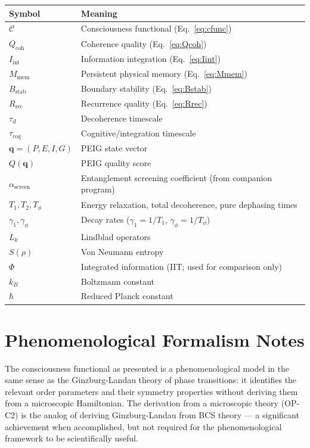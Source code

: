 \documentclass[12pt,letterpaper]{article}
\newcommand{\Cfunc}{\mathcal{C}}
\newcommand{\Qcoh}{Q_{\mathrm{coh}}}
\newcommand{\Iint}{I_{\mathrm{int}}}
\newcommand{\Mmem}{M_{\mathrm{mem}}}
\newcommand{\Bstab}{B_{\mathrm{stab}}}
\newcommand{\Rrec}{R_{\mathrm{rec}}}
\newcommand{\taud}{\tau_{\mathrm{d}}}
\newcommand{\taucog}{\tau_{\mathrm{cog}}}
\newcommand{\ascreen}{\alpha_{\mathrm{screen}}}
\begin{document}
\begin{center}
\begin{tabular}{p{2.5cm} p{9cm}}
\toprule
\textbf{Symbol} & \textbf{Meaning} \\
\midrule
$\Cfunc$ & Consciousness functional (Eq.~\ref{eq:cfunc}) \\
$\Qcoh$ & Coherence quality (Eq.~\ref{eq:Qcoh}) \\
$\Iint$ & Information integration (Eq.~\ref{eq:Iint}) \\
$\Mmem$ & Persistent physical memory (Eq.~\ref{eq:Mmem}) \\
$\Bstab$ & Boundary stability (Eq.~\ref{eq:Bstab}) \\
$\Rrec$ & Recurrence quality (Eq.~\ref{eq:Rrec}) \\
$\taud$ & Decoherence timescale \\
$\taucog$ & Cognitive/integration timescale \\
$\mathbf{q} = (P,E,I,G)$ & PEIG state vector \\
$Q(\mathbf{q})$ & PEIG quality score \\
$\ascreen$ & Entanglement screening coefficient (from companion program) \\
$T_1, T_2, T_\phi$ & Energy relaxation, total decoherence, pure dephasing times \\
$\gamma_1, \gamma_\phi$ & Decay rates ($\gamma_1 = 1/T_1$, $\gamma_\phi = 1/T_\phi$) \\
$L_k$ & Lindblad operators \\
$S(\rho)$ & Von Neumann entropy \\
$\Phi$ & Integrated information (IIT; used for comparison only) \\
$k_B$ & Boltzmann constant \\
$\hbar$ & Reduced Planck constant \\
\bottomrule
\end{tabular}
\end{center}

\section{Phenomenological Formalism Notes}
\label{app:formalism}

The consciousness functional as presented is a phenomenological model in the
same sense as the Ginzburg-Landau theory of phase transitions: it identifies
the relevant order parameters and their symmetry properties without deriving
them from a microscopic Hamiltonian. The derivation from a microscopic theory
(OP-C2) is the analog of deriving Ginzburg-Landau from BCS theory --- a
significant achievement when accomplished, but not required for the
phenomenological framework to be scientifically useful.
\end{document}
